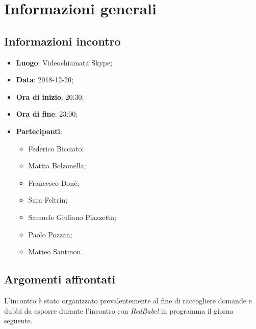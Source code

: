 \section{Informazioni generali}

\subsection{Informazioni incontro}
\begin{itemize}
\item \textbf{Luogo}: Videochiamata Skype;
\item \textbf{Data}: 2018-12-20;
\item \textbf{Ora di inizio}: 20:30;
\item \textbf{Ora di fine}: 23:00;
\item \textbf{Partecipanti}: 
	\begin{itemize}
		\item Federico Bicciato;
		\item Mattia Bolzonella;
		\item Francesco Donè;
		\item Sara Feltrin;
		\item Samuele Giuliano Piazzetta;
		\item Paolo Pozzan;
		\item Matteo Santinon.
	\end{itemize}
\end{itemize}

\subsection{Argomenti affrontati}
L'incontro è stato organizzato prevalentemente al fine di raccogliere domande
e dubbi da esporre durante l'incontro con \textit{RedBabel} in programma il giorno 
seguente.
